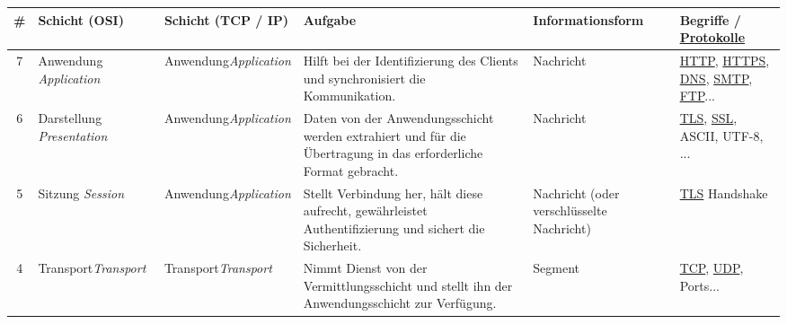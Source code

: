 \begin{tabular}{cm{2.6cm}m{2cm}m{4.6cm}m{2.5cm}m{2cm}}
		\textbf{\#}              & \textbf{Schicht (\acrshort{OSI})}                     & \textbf{Schicht \newline (\acrshort{TCP} / \acrshort{IP})}  & \textbf{Aufgabe}                                                                                                & \textbf{Informations\-form}               & \textbf{Begriffe / \newline \underline{Protokolle}}   \\ \midrule
		\rowcolor{\applicationLayerColor!10}7    & Anwendung \newline \textit{Application}    & Anwendung\newline\textit{Application} & Hilft bei der Identifizierung des Clients und synchronisiert die Kommunikation.                                 & Nachricht                                 & \underline{\acrshort{HTTP}}, \underline{\acrshort{HTTPS}}, \underline{\acrshort{DNS}}, \underline{\acrshort{SMTP}}, \underline{\acrshort{FTP}}...        \\\midrule
		\rowcolor{\applicationLayerColor!20}6    & Darstellung \newline \textit{Presentation} & Anwendung\newline\textit{Application} & Daten von der Anwendungsschicht werden extrahiert und für die Übertragung in das erforderliche Format gebracht. & Nachricht                                 & \underline{\acrshort{TLS}}, \underline{\acrshort{SSL}}, \acrshort{ASCII}, \acrshort{UTF-8}, ...      \\\midrule
		\rowcolor{yellow!30}5    & Sitzung \newline \textit{Session}          & Anwendung\newline\textit{Application} & Stellt Verbindung her, hält diese aufrecht, gewährleistet Authentifizierung und sichert die Sicherheit.         & Nachricht (oder verschlüsselte Nachricht) & \underline{\acrshort{TLS}} Handshake           \\\midrule
		\rowcolor{\transportLayerColor!20}4    & Transport\newline \textit{Transport}       & Transport\newline\textit{Transport}   & Nimmt Dienst von der Vermittlungsschicht und stellt ihn der Anwendungsschicht zur Verfügung.                    & Segment                                   & \underline{\acrshort{TCP}}, \underline{\acrshort{UDP}}, Ports... \\\midrule

\end{tabular}
